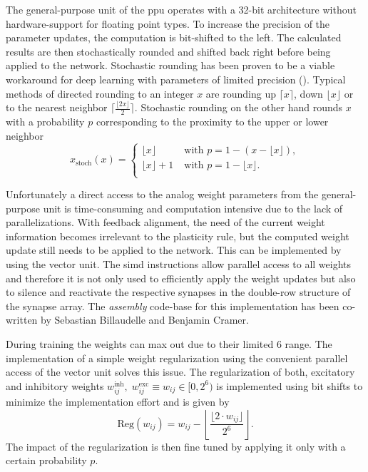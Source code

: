 The general-purpose unit of the \gls{ppu} operates with a 32-bit architecture without hardware-support for floating point types. To increase the precision of the parameter updates, the computation is bit-shifted to the left. The calculated results are then stochastically rounded and shifted back right before being applied to the network. Stochastic rounding has been proven to be a viable workaround for deep learning with parameters of limited precision (\citealp{limitedprecisionpaper}). Typical methods of directed rounding to an integer $x$ are rounding up $\lceil x\rceil$, down $\lfloor x\rfloor$ or to the nearest neighbor $\lceil\frac{\lfloor2x\rfloor}{2}\rceil$. Stochastic rounding on the other hand rounds $x$ with a probability $p$ corresponding to the proximity to the upper or lower neighbor
\begin{equation*}
x_\text{stoch}(x) = 
\begin{cases}
\lfloor x \rfloor \quad \quad &\text{with } p = 1 - (x - \lfloor x \rfloor), \\
\lfloor x \rfloor + 1 &\text{with } p = 1 - \lfloor x \rfloor. \\
\end{cases}
\end{equation*}

Unfortunately a direct access to the analog weight parameters from the general-purpose unit is time-consuming and computation intensive due to the lack of parallelizations. With feedback alignment, the need of the current weight information becomes irrelevant to the plasticity rule, but the computed weight update still needs to be applied to the network. This can be implemented by using the vector unit. The \gls{simd} instructions allow parallel access to all weights and therefore it is not only used to efficiently apply the weight updates but also to silence and reactivate the respective synapses in the double-row structure of the synapse array. The \emph{assembly} code-base for this implementation has been co-written by Sebastian Billaudelle and Benjamin Cramer.

During training the weights can max out due to their limited \SI{6}{\bit} range. The implementation of a simple weight regularization using the convenient parallel access of the vector unit solves this issue. The regularization of both, excitatory and inhibitory weights $w_{ij}^\text{inh},\; w_{ij}^\text{exc}\equiv w_{ij} \in [0,2^6)$ is implemented using bit shifts to minimize the implementation effort and is given by
\begin{equation*}
\text{Reg}(w_{ij}) = w_{ij} - \left\lfloor \frac{\lfloor 2 \cdot w_{ij}  \rfloor}{2^{6}} \right\rfloor.					
\end{equation*}
The impact of the regularization is then fine tuned by applying it only with a certain probability $p$.

